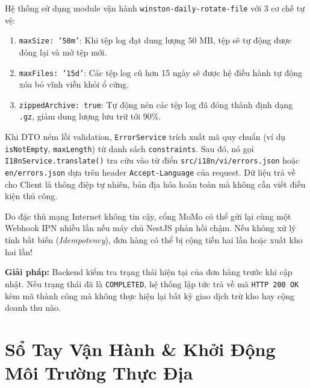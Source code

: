 \documentclass[12pt,a4paper,oneside]{book}
\begin{document}
\begin{qnabox}
  Hệ thống sử dụng module vận hành \texttt{winston-daily-rotate-file} với 3 cơ chế tự vệ:
  \begin{enumerate}
    \item \texttt{maxSize: '50m'}: Khi tệp log đạt dung lượng $50\text{ MB}$, tệp sẽ tự động được đóng lại và mở tệp mới.
    \item \texttt{maxFiles: '15d'}: Các tệp log cũ hơn 15 ngày sẽ được hệ điều hành tự động xóa bỏ vĩnh viễn khỏi ổ cứng.
    \item \texttt{zippedArchive: true}: Tự động nén các tệp log đã đóng thành định dạng \texttt{.gz}, giảm dung lượng lưu trữ tới 90\%.
  \end{enumerate}
\end{qnabox}

\begin{qnabox}
  Khi DTO ném lỗi validation, \texttt{ErrorService} trích xuất mã quy chuẩn (ví dụ \texttt{isNotEmpty}, \texttt{maxLength}) từ danh sách \texttt{constraints}. Sau đó, nó gọi \texttt{I18nService.translate()} tra cứu vào từ điển \texttt{src/i18n/vi/errors.json} hoặc \texttt{en/errors.json} dựa trên header \texttt{Accept-Language} của request. Dữ liệu trả về cho Client là thông điệp tự nhiên, bản địa hóa hoàn toàn mà không cần viết điều kiện thủ công.
\end{qnabox}

\begin{qnabox}
  Do đặc thù mạng Internet không tin cậy, cổng MoMo có thể gửi lại cùng một Webhook IPN nhiều lần nếu máy chủ NestJS phản hồi chậm. Nếu không xử lý tính bất biến (\textit{Idempotency}), đơn hàng có thể bị cộng tiền hai lần hoặc xuất kho hai lần!
  
  \textbf{Giải pháp:} Backend kiểm tra trạng thái hiện tại của đơn hàng trước khi cập nhật. Nếu trạng thái đã là \texttt{COMPLETED}, hệ thống lập tức trả về mã \texttt{HTTP 200 OK} kèm mã thành công mà không thực hiện lại bất kỳ giao dịch trừ kho hay cộng doanh thu nào.
\end{qnabox}

\chapter{Sổ Tay Vận Hành \& Khởi Động Môi Trường Thực Địa}
\end{document}
